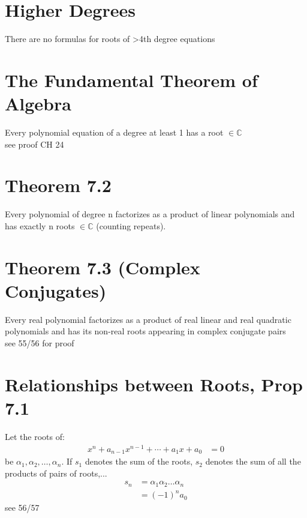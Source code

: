 \documentclass[12pt]{article}
\newcommand{\C}{\mathbb{C}}
\begin{document}
\section{Higher Degrees}
	There are no formulas for roots of >4th degree equations
\section{The Fundamental Theorem of Algebra}
	Every polynomial equation of a degree at least 1 has a root $ \in\C $\\
	see proof CH 24
\section{Theorem 7.2}
	Every polynomial of degree n factorizes as a product of linear
	polynomials and has exactly n roots $ \in\C $ (counting repeats).
\section{Theorem 7.3 (Complex Conjugates)}
	Every real polynomial factorizes as a product of real linear and real
	quadratic polynomials and has its non-real roots appearing in 
	complex conjugate pairs\\
	see 55/56 for proof
\section{Relationships between Roots, Prop 7.1}
	Let the roots of:
	\begin{align*}
		x^n + a_{n-1}x^{n-1}+\cdots+a_1x+a_0 &= 0
	\end{align*}
	be $ \alpha_1, \alpha_2,\dots, \alpha_n $. If $ s_1 $ denotes the
	sum of the roots, $ s_2 $ denotes the sum of all the products
	of pairs of roots,...
	\begin{align*}
		s_n &= \alpha_1 \alpha_2 \dots \alpha_n \\
			&= (-1)^{n}a_0
	\end{align*}
	see 56/57
\end{document}
